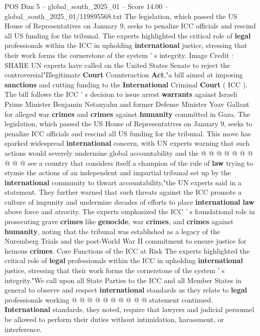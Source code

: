 \begin{textsample}{POS Dim 5 – global\_south\_2025\_01 – Score 14.00 – global\_south\_2025\_01/119895568.txt}  \label{ex:f5_pos_355}
The legislation, which passed the US House of Representatives on January 9, seeks to penalize ICC officials and rescind all US funding for the tribunal.
The experts highlighted the critical role of \textbf{legal} professionals within the ICC in upholding \textbf{international} justice, stressing that their work forms the cornerstone of the system ' s integrity.
Image Credit : SHARE UN experts have called on the United States Senate to reject the controversial"Illegitimate \textbf{Court} Counteraction \textbf{Act},"a bill aimed at imposing \textbf{sanctions} and cutting funding to the \textbf{International} Criminal \textbf{Court} ( ICC ).
The bill follows the ICC ' s decision to issue arrest \textbf{warrants} against Israeli Prime Minister Benjamin Netanyahu and former Defense Minister Yoav Gallant for alleged war \textbf{crimes} and \textbf{crimes} against \textbf{humanity} committed in Gaza.
The legislation, which passed the US House of Representatives on January 9, seeks to penalize ICC officials and rescind all US funding for the tribunal.
This move has sparked widespread \textbf{international} concern, with UN experts warning that such actions would severely undermine global accountability and the @ @ @ @ @ @ @ @ @ @ see a country that considers itself a champion of the rule of \textbf{law} trying to stymie the actions of an independent and impartial tribunal set up by the \textbf{international} community to thwart accountability,"the UN experts said in a statement.
They further warned that such threats against the ICC promote a culture of impunity and undermine decades of efforts to place \textbf{international} \textbf{law} above force and atrocity.
The experts emphasized the ICC ' s foundational role in prosecuting grave \textbf{crimes} like \textbf{genocide}, war \textbf{crimes}, and \textbf{crimes} against \textbf{humanity}, noting that the tribunal was established as a legacy of the Nuremberg Trials and the post-World War II commitment to ensure justice for heinous \textbf{crimes}.
Core Functions of the ICC at Risk The experts highlighted the critical role of \textbf{legal} professionals within the ICC in upholding \textbf{international} justice, stressing that their work forms the cornerstone of the system ' s integrity."We call upon all State Parties to the ICC and all Member States in general to observe and respect \textbf{international} standards as they relate to \textbf{legal} professionals working @ @ @ @ @ @ @ @ @ @ statement continued. \textbf{International} standards, they noted, require that lawyers and judicial personnel be allowed to perform their duties without intimidation, harassment, or interference.

\end{textsample}

